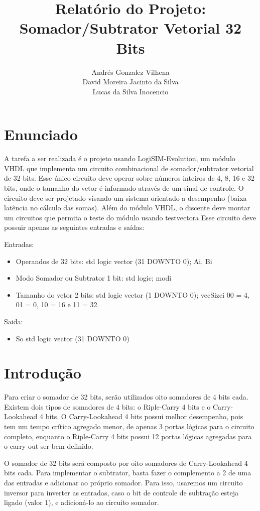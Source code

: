 \documentclass[12pt]{article}
\title{Relatório do Projeto: Somador/Subtrator Vetorial 32 Bits}
\author{Andrés Gonzalez Vilhena\\
        David Moreira Jacinto da Silva\\
        Lucas da Silva Inocencio}
\begin{document}
\maketitle

\section{Enunciado}

A tarefa a ser realizada é o projeto usando LogiSIM-Evolution, um módulo VHDL que
implementa um circuito combinacional de somador/subtrator vetorial de 32 bits. Esse
único circuito deve operar sobre números inteiros de 4, 8, 16 e 32 bits, onde o tamanho
do vetor é informado através de um sinal de controle. O circuito deve ser projetado
visando um sistema orientado a desempenho (baixa latência no cálculo das somas). Além
do módulo VHDL, o discente deve montar um circuitos que permita o teste do módulo
usando testvectora Esse circuito deve possuir apenas as seguintes entradas e saídas:

Entradas:

\begin{itemize}
    \item Operandos de 32 bits: std logic vector (31 DOWNTO 0); Ai, Bi
    \item Modo Somador ou Subtrator 1 bit: std logic; modi
    \item Tamanho do vetor 2 bits: std logic vector (1 DOWNTO 0); vecSizei
    00 = 4, 01 = 0, 10 = 16 e 11 = 32
\end{itemize}

Saida:

\begin{itemize}
    \item So std logic vector (31 DOWNTO 0)
\end{itemize}

\section{Introdução}

Para criar o somador de 32 bits, serão utilizados oito somadores de 4 bits cada. Existem dois tipos de somadores de 4 bits: o Riple-Carry 4 bits e o Carry-Lookahead 4 bits. O Carry-Lookahead 4 bits possui melhor desempenho, pois tem um tempo crítico agregado menor, de apenas 3 portas lógicas para o circuito completo, enquanto o Riple-Carry 4 bits possui 12 portas lógicas agregadas para o carry-out ser bem definido.

O somador de 32 bits será composto por oito somadores de Carry-Lookahead 4 bits cada. Para implementar o subtrator, basta fazer o complemento a 2 de uma das entradas e adicionar ao próprio somador. Para isso, usaremos um circuito inversor para inverter as entradas, caso o bit de controle de subtração esteja ligado (valor 1), e adicioná-lo ao circuito somador.
\end{document}
